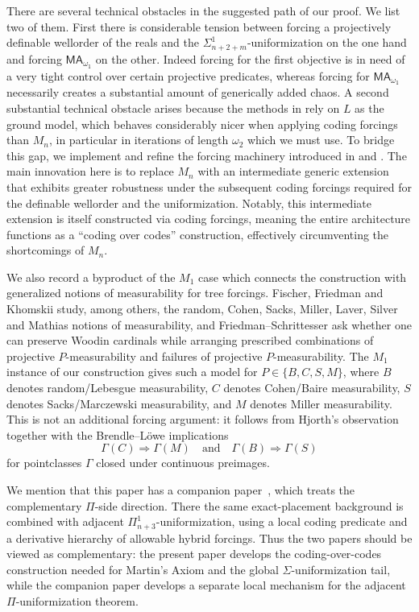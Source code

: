 \documentclass[a4paper,11pt]{article}
\newcommand{\MA}{\mathsf{MA_{\omega_1}}}
\begin{document}
There are several technical obstacles in the suggested path of our proof. We list two of them. First there is considerable tension between forcing a projectively definable wellorder of the reals and the $\Sigma^1_{n+2+m}$-uniformization on the one hand and forcing
$\MA$ on the other. Indeed forcing for the first objective is in need of  a very tight control over certain projective predicates, whereas forcing for $\MA$ necessarily creates a substantial amount of generically added chaos. 
A second substantial technical obstacle arises because the methods in \cite{BPFA_and_global_Sigma-uniformization}  rely on $L$ as the ground model, which behaves considerably nicer when applying coding forcings than $M_n$, in particular in iterations of length $\omega_2$ which we must use. To bridge this gap, we implement and refine the forcing machinery introduced in \cite{NS_saturated_and_definable} and \cite{NS_saturated_and_definable_and_MA}. The main innovation here is to replace $M_n$ with an intermediate generic extension that exhibits greater robustness under the subsequent coding forcings required for the definable wellorder and the uniformization. Notably, this intermediate extension is itself constructed via coding forcings, meaning the entire architecture functions as a ``coding over codes'' construction, effectively circumventing the shortcomings of $M_n$.


We also record a byproduct of the $M_1$ case which connects the construction
with generalized notions of measurability for tree forcings. Fischer,
Friedman and Khomskii study, among others, the random, Cohen, Sacks, Miller,
Laver, Silver and Mathias notions of measurability, and Friedman--Schrittesser
ask whether one can preserve Woodin cardinals while arranging prescribed
combinations of projective $P$-measurability and failures of projective
$P$-measurability. The $M_1$ instance of our construction gives such a model
for $P\in\{B,C,S,M\}$, where $B$ denotes random/Lebesgue measurability,
$C$ denotes Cohen/Baire measurability, $S$ denotes Sacks/Marczewski
measurability, and $M$ denotes Miller measurability. This is not an additional
forcing argument: it follows from Hjorth's observation together with the
Brendle--L\"owe implications
\[
\Gamma(C)\Rightarrow \Gamma(M)
\quad\text{and}\quad
\Gamma(B)\Rightarrow \Gamma(S)
\]
for pointclasses $\Gamma$ closed under continuous preimages.

We
mention that this paper has a companion paper~\cite{LocalDelfinoPi}, which
treats the complementary $\Pi$-side direction.  There the same exact-placement
background is combined with adjacent $\Pi^1_{n+3}$-uniformization, using a
local coding predicate and a derivative hierarchy of allowable hybrid forcings.
Thus the two papers should be viewed as complementary: the present paper
develops the coding-over-codes construction needed for Martin's Axiom and the
global $\Sigma$-uniformization tail, while the companion paper develops a
separate local mechanism for the adjacent $\Pi$-uniformization theorem.
\end{document}
